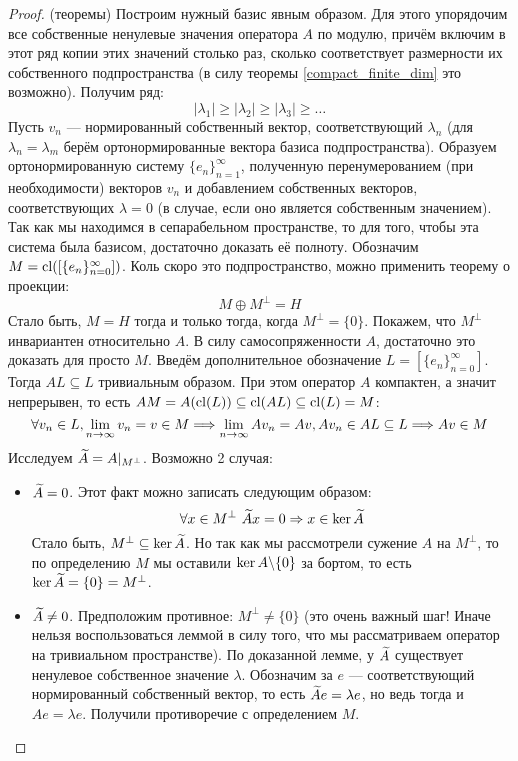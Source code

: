 \begin{proof} (теоремы)
	Построим нужный базис явным образом. Для этого упорядочим все собственные ненулевые значения оператора $A$ по модулю, причём включим в этот ряд копии этих значений столько раз, сколько соответствует размерности их собственного подпространства (в силу теоремы \ref{compact_finite_dim} это возможно). Получим ряд:
	\[
		|\lambda_1| \ge |\lambda_2| \ge |\lambda_3| \ge \ldots
	\]
	Пусть $v_n$ --- нормированный собственный вектор, соответствующий $\lambda_n$ (для $\lambda_n = \lambda_m$ берём ортонормированные вектора базиса подпространства). Образуем ортонормированную систему $\{e_n\}_{n = 1}^\infty$, полученную перенумерованием (при необходимости) векторов $v_n$ и добавлением собственных векторов, соответствующих $\lambda = 0$ (в случае, если оно является собственным значением). Так как мы находимся в сепарабельном пространстве, то для того, чтобы эта система была базисом, достаточно доказать её полноту. Обозначим $M = \operatorname{cl}([\{e_n\}_{n = 0}^\infty])$. Коль скоро это подпространство, можно применить теорему о проекции:
	\[
		M \oplus M^\bot = H
	\]
	Стало быть, $M = H$ тогда и только тогда, когда $M^\bot = \{0\}$. Покажем, что $M^\bot$ инвариантен относительно $A$. В силу самосопряженности $A$, достаточно это доказать для просто $M$. Введём дополнительное обозначение $L = [\{e_n\}_{n = 0}^\infty]$. Тогда $AL \subseteq L$ тривиальным образом. При этом оператор $A$ компактен, а значит непрерывен, то есть $AM = A(\operatorname{cl}(L)) \subseteq \operatorname{cl}(AL) \subseteq \operatorname{cl}(L) = M$:
	\[
		\forall v_n \in L, \lim_{n \to \infty} v_n = v \in M \Longrightarrow \lim_{n \to \infty} Av_n = Av, Av_n \in AL \subseteq L \Longrightarrow Av \in M
	\]
	Исследуем $\widetilde{A} = A|_{M^\bot}$. Возможно 2 случая:
	\begin{itemize}
		\item $\widetilde{A} = 0$. Этот факт можно записать следующим образом:
		\[
			\forall x \in M^\bot\ \widetilde{A}x = 0 \Rightarrow x \in \ker \widetilde{A}
		\]
		Стало быть, $M^\bot \subseteq \ker \widetilde{A}$. Но так как мы рассмотрели сужение $A$ на $M^\bot$, то по определению $M$ мы оставили $\ker A \backslash \{0\}$ за бортом, то есть $\ker \widetilde{A} = \{0\} = M^\bot$.
		
		\item $\widetilde{A} \neq 0$. Предположим противное: $M^\bot \neq \{0\}$ (это очень важный шаг! Иначе нельзя воспользоваться леммой в силу того, что мы рассматриваем оператор на тривиальном пространстве). По доказанной лемме, у $\widetilde{A}$ существует ненулевое собственное значение $\lambda$. Обозначим за $e$ --- соответствующий нормированный собственный вектор, то есть $\widetilde{A}e = \lambda e$, но ведь тогда и $Ae = \lambda e$. Получили противоречие с определением $M$.
	\end{itemize}
\end{proof}

